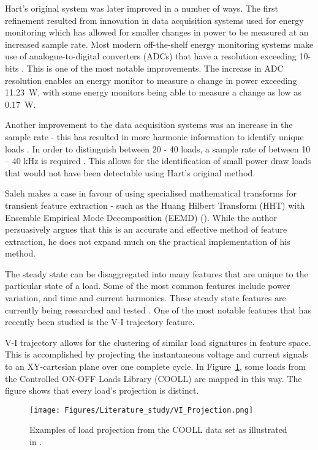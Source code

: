 \par
Hart's original system was later improved in a number of ways. The first refinement resulted from innovation in data acquisition systems used for energy monitoring which has allowed for smaller changes in power to be measured at an increased sample rate. Most modern off-the-shelf energy monitoring systems make use of analogue-to-digital converters (ADCs) that have a resolution exceeding 10-bits \cite{RN48}. This is one of the most notable improvements. The increase in ADC resolution enables an energy monitor to measure a change in power exceeding \qty{11.23}{\watt}, with some energy monitors being able to measure a change as low as \qty{0.17}{\watt}. 
\par
Another improvement to the data acquisition systems was an increase in the sample rate - this has resulted in more harmonic information to identify unique loads \cite{RN52}. In order to distinguish between 20 - 40 loads, a sample rate of between 10 – 40 kHz is required \cite{RN52}. This allows for the identification of small power draw loads that would not have been detectable using Hart's original method.
\par
Saleh makes a case in favour of using specialised mathematical transforms for transient feature extraction - such as the Huang Hilbert Transform (HHT) with Ensemble Empirical Mode Decomposition (EEMD) (\cite{RN53}). While the author persuasively argues that this is an accurate and effective method of feature extraction, he does not expand much on the practical implementation of his method.
\par
The steady state can be disaggregated into many features that are unique to the particular state of a load. Some of the most common features include power variation, and time and current harmonics. These steady state features are currently being researched and tested \cite{8895360}.
One of the most notable features that has recently been studied is the V-I trajectory feature. 
\par
V-I trajectory allows for the clustering of similar load signatures in feature space. This is accomplished by projecting the instantaneous voltage and current signals to an XY-cartesian plane over one complete cycle. In Figure~\ref{fig:2}, some loads from the Controlled ON-OFF Loads Library (COOLL) are mapped in this way. The figure shows that every load's projection is distinct. 
\begin{figure}[H]
    \centering
    \texttt{[image: Figures/Literature\_study/VI\_Projection.png]}
    \caption{Examples of load projection from the COOLL data set as illustrated in \cite{8895360}.}
    \label{fig:2}
\end{figure}
